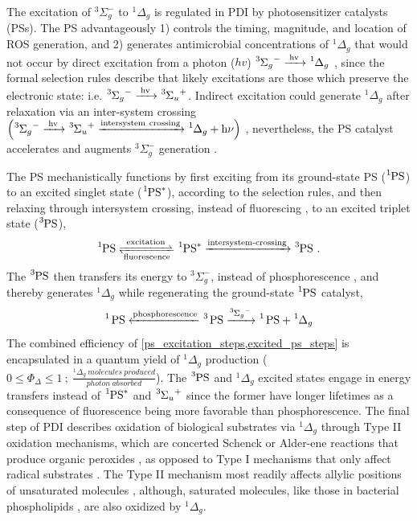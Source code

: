 The excitation of $^3\Sigma_g^-$ to $^1\Delta_g$ is regulated in PDI by photosensitizer catalysts (PSs). The PS advantageously 1) controls the timing, magnitude, and location of ROS generation, and 2) generates antimicrobial concentrations of $^1\Delta_g$ that would not occur by direct excitation from a photon ($hv$) $\ce{^3\Sigma_g^- ->[{hv}] ^1\Delta_g}$ \cite{Krasnovsky2012PhotochemicalEnvironment}, since the formal selection rules \cite{Bowen1936ForbiddenLines} describe that likely excitations are those which preserve the electronic state: i.e. $\ce{^3\Sigma_g^- ->[{hv}] ^3\Sigma_u^+}$. Indirect excitation could generate $^1\Delta_g$ after relaxation via an inter-system crossing $\left( \ce{^3\Sigma_g^- ->[{hv}] ^3\Sigma_u^+ ->[{intersystem~crossing}] ^1\Delta_g + h\nu} \right)$ \cite{Long2003SelectionOxygen}, nevertheless, the PS catalyst accelerates and augments $^3\Sigma_g^-$ generation \cite{You2018ChemicalOxygen,Schalk2008Near-infraredTetratolyl-porphyrins,Jockusch2008SingletExcitation}. 

The PS mechanistically functions by first exciting from its ground-state PS ($\ce{^1PS}$) to an excited singlet state ($\ce{^1PS^*}$), according to the selection rules, and then relaxing through intersystem crossing, instead of fluorescing \cite{Kessel1982DeterminantsSpectra}, to an excited triplet state ($\ce{^3PS}$),
\begin{equation} \label{ps_excitation_steps}
    \ce{^1PS <=>[{excitation}][{fluorescence}] ^1PS^* ->[{intersystem-crossing}] ^3PS}~.
\end{equation}
The $\ce{^3PS}$ then transfers its energy to $^3\Sigma_g^-$, instead of phosphorescence \cite{Mcrae1958Enhancement6}, and thereby generates $^1\Delta_g$ while regenerating the ground-state $\ce{^1PS}$ catalyst,
\begin{equation} \label{excited_ps_steps}
    \ce{^1 PS <-[{phosphorescence}] ^3 PS ->[^3\Sigma_g^-] ^1 PS + ^1\Delta_g}
\end{equation}
The combined efficiency of \cref{ps_excitation_steps,excited_ps_steps} is encapsulated in a quantum yield of $^1\Delta_g$ production \cite{Bakalova2004QuantumPhotosensitizers} ($0\le \Phi_{\Delta}\le 1 ~;~ \frac{^1\Delta_g ~molecules ~produced}{photon ~absorbed}$). The $\ce{^3PS}$ and $^1\Delta_g$ excited states engage in energy transfers instead of $\ce{^1PS^*}$ and $\ce{^3\Sigma_u^+}$ since the former have longer lifetimes as a consequence of fluorescence being more favorable than phosphorescence. The final step of PDI describes oxidation of biological substrates via $^1\Delta_g$ through Type II oxidation mechanisms, which are concerted Schenck \cite{Prein1996TheApplications} or Alder-ene \cite{Fernandez-torquemada2012DispersionPlants} reactions that produce organic peroxides \cite{Foote1965ChemistrySelectivity}, as opposed to Type I mechanisms \cite{Bolland1949KineticsOxidation,Farmer1943TheRubber,Grynova2011RevisingAutooxidation} that only affect radical substrates \cite{Litwinienko1999DifferentialEsters}. The Type II mechanism most readily affects allylic positions of unsaturated molecules \cite{Ellison1996ThermochemistryIons,Sehon1950TheRadical}, although, saturated molecules, like those in bacterial phospholipids \cite{ODonnell1985NumericalStaphylococci}, are also oxidized by $^1\Delta_g$. 

